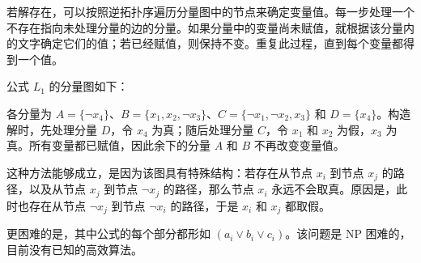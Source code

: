 若解存在，可以按照逆拓扑序遍历分量图中的节点来确定变量值。每一步处理一个不存在指向未处理分量的边的分量。如果分量中的变量尚未赋值，就根据该分量内的文字确定它们的值；若已经赋值，则保持不变。重复此过程，直到每个变量都得到一个值。

公式 $L_1$ 的分量图如下：
\begin{center}
\end{center}

各分量为 $A = \{\lnot x_4\}$、$B = \{x_1, x_2, \lnot x_3\}$、$C = \{\lnot x_1, \lnot x_2, x_3\}$ 和 $D = \{x_4\}$。构造解时，先处理分量 $D$，令 $x_4$ 为真；随后处理分量 $C$，令 $x_1$ 和 $x_2$ 为假，$x_3$ 为真。所有变量都已赋值，因此余下的分量 $A$ 和 $B$ 不再改变变量值。

这种方法能够成立，是因为该图具有特殊结构：若存在从节点 $x_i$ 到节点 $x_j$ 的路径，以及从节点 $x_j$ 到节点 $\lnot x_j$ 的路径，那么节点 $x_i$ 永远不会取真。原因是，此时也存在从节点 $\lnot x_j$ 到节点 $\lnot x_i$ 的路径，于是 $x_i$ 和 $x_j$ 都取假。


更困难的是，其中公式的每个部分都形如 $(a_i \lor b_i \lor c_i)$。该问题是 NP 困难的，目前没有已知的高效算法。

